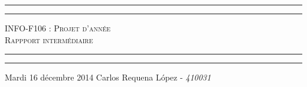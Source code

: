 \begin{titlepage}

\begin{center}
    \vspace*{\fill}
        \hrule
        \vspace*{2pt}
        \hrule
        \vspace*{15pt}
        \textsc{\Huge{INFO-F106 : Projet d'année \\\vspace*{8pt} Rappport intermédiaire}}
        \vspace*{15pt}
        \hrule
        \vspace*{2pt}
        \hrule
  \vspace*{\fill}
\end{center}
\null
\vfill
  
\large{Mardi 16 décembre 2014} \hfill \large{Carlos Requena López - \emph{410031}}

\end{titlepage}